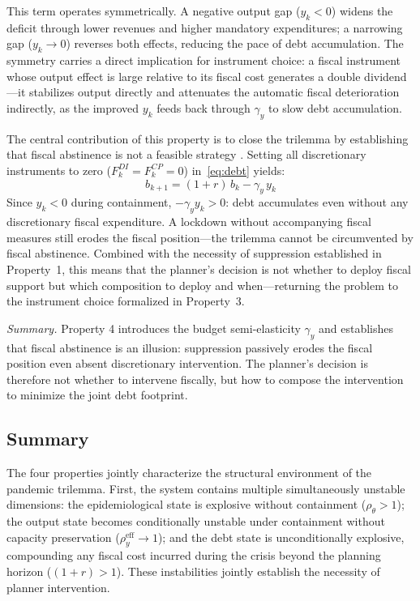 \documentclass[12pt, a4paper]{article}
\begin{document}
This term operates symmetrically. A negative output gap ($y_k < 0$) widens the deficit through lower revenues and higher mandatory expenditures; a narrowing gap ($y_k \to 0$) reverses both effects, reducing the pace of debt accumulation. The symmetry carries a direct implication for instrument choice: a fiscal instrument whose output effect is large relative to its fiscal cost generates a double dividend---it stabilizes output directly and attenuates the automatic fiscal deterioration indirectly, as the improved $y_k$ feeds back through $\gamma_y$ to slow debt accumulation.

The central contribution of this property is to close the trilemma by establishing that fiscal abstinence is not a feasible strategy \citep{Fornaro2020}. Setting all discretionary instruments to zero ($F_k^{DI} = F_k^{CP} = 0$) in~\eqref{eq:debt} yields:
%
\begin{equation}
    b_{k+1} = (1+r) \, b_k - \gamma_y \, y_k
    \label{eq:debt_no_fiscal}
\end{equation}
%
Since $y_k < 0$ during containment, $-\gamma_y y_k > 0$: debt accumulates even without any discretionary fiscal expenditure. A lockdown without accompanying fiscal measures still erodes the fiscal position---the trilemma cannot be circumvented by fiscal abstinence. Combined with the necessity of suppression established in Property~1, this means that the planner's decision is not whether to deploy fiscal support but which composition to deploy and when---returning the problem to the instrument choice formalized in Property~3.

\vspace{5mm}
\noindent\textit{Summary.} Property 4 introduces the budget semi-elasticity $\gamma_y$ and establishes that fiscal abstinence is an illusion: suppression passively erodes the fiscal position even absent discretionary intervention. The planner's decision is therefore not whether to intervene fiscally, but how to compose the intervention to minimize the joint debt footprint. 

\subsection{Summary}
\label{sec:Sumary}
The four properties jointly characterize the structural environment of the pandemic trilemma. First, the system contains multiple simultaneously unstable dimensions: the epidemiological state is explosive without containment ($\rho_\theta > 1$); the output state becomes conditionally unstable under containment without capacity preservation ($\rho^{\text{eff}}_y \to 1$); and the debt state is unconditionally explosive, compounding any fiscal cost incurred during the crisis beyond the planning horizon ($(1+r) > 1$). These instabilities jointly establish the necessity of planner intervention.
\end{document}
